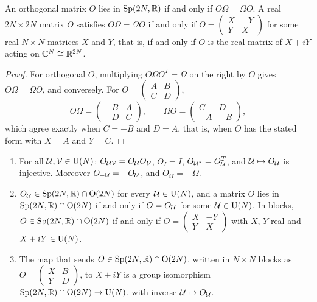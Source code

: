 \begin{vetdenv}
\begin{lemma}\label{lem:bm-commute}
An orthogonal matrix $O$ lies in $\mathrm{Sp}(2N,\mathbb R)$ if and only if $O\Omega=\Omega O$. A real $2N\times2N$ matrix $O$ satisfies
$O\Omega=\Omega O$ if and only if $O=\left(\begin{smallmatrix}X&-Y\\Y&X\end{smallmatrix}\right)$ for some real $N\times N$
matrices $X$ and $Y$, that is, if and only if $O$ is the real matrix of $X+iY$ acting on $\mathbb C^N\cong\mathbb R^{2N}$.
\end{lemma}

\begin{proof}
For orthogonal $O$, multiplying $O\Omega O^T=\Omega$ on the right by $O$ gives $O\Omega=\Omega O$, and conversely.
For $O=\left(\begin{smallmatrix}A&B\\C&D\end{smallmatrix}\right)$,
\[
 O\Omega=\begin{pmatrix}-B&A\\-D&C\end{pmatrix},\qquad \Omega O=\begin{pmatrix}C&D\\-A&-B\end{pmatrix},
\]
which agree exactly when $C=-B$ and $D=A$, that is, when $O$ has the stated form with $X=A$ and $Y=C$.
\end{proof}

\begin{theorem}\label{thm:bm-unitary}
\begin{enumerate}
\item[(a)] For all $\mathcal U,\mathcal V\in\mathrm{U}(N)$: $O_{\mathcal U\mathcal V}=O_\mathcal U O_\mathcal V$, $O_I=I$, $O_{\mathcal U^*}=O_\mathcal U^T$, and $\mathcal U\mapsto O_\mathcal U$ is
injective. Moreover $O_{-\mathcal U}=-O_\mathcal U$, and $O_{iI}=-\Omega$.
\item[(b)] $O_\mathcal U\in\mathrm{Sp}(2N,\mathbb R)\cap\mathrm{O}(2N)$ for every $\mathcal U\in\mathrm{U}(N)$, and a matrix $O$ lies in $\mathrm{Sp}(2N,\mathbb R)\cap\mathrm{O}(2N)$ if and only if $O=O_\mathcal U$ for some
$\mathcal U\in\mathrm{U}(N)$. In blocks, $O\in\mathrm{Sp}(2N,\mathbb R)\cap\mathrm{O}(2N)$ if and only if $O=\left(\begin{smallmatrix}X&-Y\\Y&X\end{smallmatrix}\right)$ with $X$,
$Y$ real and $X+iY\in\mathrm{U}(N)$.
\item[(c)] The map that sends $O\in\mathrm{Sp}(2N,\mathbb R)\cap\mathrm{O}(2N)$, written in $N\times N$ blocks as
$O=\left(\begin{smallmatrix}X&B\\Y&D\end{smallmatrix}\right)$, to $X+iY$ is a group isomorphism $\mathrm{Sp}(2N,\mathbb R)\cap\mathrm{O}(2N)\to\mathrm{U}(N)$, with
inverse $\mathcal U\mapsto O_\mathcal U$.
\end{enumerate}
\end{theorem}


\end{vetdenv}
